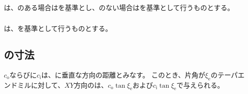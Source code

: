 \subsection{\EndFaceCChamferMillingReferencePoint}

\subsubsection{\EndFaceOutCChamferMillingReferencePoint}
\EndFaceOutCChamferMillingReferencePoint は、\Outcut のある場合は\OutcutCenter を基準とし、\Outcut のない場合は\EndFaceIDCenter を基準として行うものとする。

\subsubsection{\EndFaceInCChamferMillingReferencePoint}
\EndFaceInCChamferMillingReferencePoint は、\OutcutIDCenter を基準として行うものとする。


\subsection{\EndFaceCChamferMilling の寸法}
\EndFaceOutCChamferLength$c_\mathrm o$ならびに\EndFaceInCChamferLength$c_\mathrm i$は、\EndFace に垂直な方向の距離とみなす。
このとき、片角が$\xi_\mathrm e$のテーパエンドミルに対して、$XY$方向の\EndFaceCChamferLength は、$c_\mathrm o\tan\xi_\mathrm e$および$c_\mathrm i\tan\xi_\mathrm e$で与えられる。


